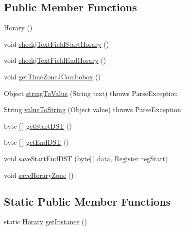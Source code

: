\subsection*{Public Member Functions}
\begin{DoxyCompactItemize}
\item 
\hyperlink{classcom_1_1eneri_1_1scorpio__metertool_1_1ui_1_1_horary_a7a3d2ae465ad0040054edf0d102a5712}{Horary} ()
\item 
void \hyperlink{classcom_1_1eneri_1_1scorpio__metertool_1_1ui_1_1_horary_a12815cedde6ea57f66f0d1414b14dba0}{checkj\+Text\+Field\+Start\+Horary} ()
\item 
void \hyperlink{classcom_1_1eneri_1_1scorpio__metertool_1_1ui_1_1_horary_a070ba40ea69641c4791babd9ac4e7b4f}{checkj\+Text\+Field\+End\+Horary} ()
\item 
void \hyperlink{classcom_1_1eneri_1_1scorpio__metertool_1_1ui_1_1_horary_abb910b52dcba5910e5dc74988487ad42}{get\+Time\+Zone\+J\+Combobox} ()
\item 
Object \hyperlink{classcom_1_1eneri_1_1scorpio__metertool_1_1ui_1_1_horary_aef6628350e81f25ac2818450cc19fcf4}{string\+To\+Value} (String text)  throws Parse\+Exception   
\item 
String \hyperlink{classcom_1_1eneri_1_1scorpio__metertool_1_1ui_1_1_horary_a6ccef95eca3c5e71f3841c4d683dca95}{value\+To\+String} (Object value)  throws Parse\+Exception   
\item 
byte \mbox{[}$\,$\mbox{]} \hyperlink{classcom_1_1eneri_1_1scorpio__metertool_1_1ui_1_1_horary_a1185998df33573dc9744d856a7e6e74d}{get\+Start\+D\+ST} ()
\item 
byte \mbox{[}$\,$\mbox{]} \hyperlink{classcom_1_1eneri_1_1scorpio__metertool_1_1ui_1_1_horary_aa6e622f820021639b7cdd2b33b8f4ba5}{get\+End\+D\+ST} ()
\item 
void \hyperlink{classcom_1_1eneri_1_1scorpio__metertool_1_1ui_1_1_horary_a4f00b52395585402a8a2ea71db6d9bdf}{save\+Start\+End\+D\+ST} (byte\mbox{[}$\,$\mbox{]} data, \hyperlink{enumcom_1_1eneri_1_1scorpio__metertool_1_1devices_1_1_register}{Register} reg\+Start)
\item 
void \hyperlink{classcom_1_1eneri_1_1scorpio__metertool_1_1ui_1_1_horary_a87a655b160e416a593d6e8f0b89bd0fa}{save\+Horary\+Zone} ()
\end{DoxyCompactItemize}
\subsection*{Static Public Member Functions}
\begin{DoxyCompactItemize}
\item 
static \hyperlink{classcom_1_1eneri_1_1scorpio__metertool_1_1ui_1_1_horary}{Horary} \hyperlink{classcom_1_1eneri_1_1scorpio__metertool_1_1ui_1_1_horary_aea828d183e47dccfeea69615555f6c34}{get\+Instance} ()
\end{DoxyCompactItemize}
